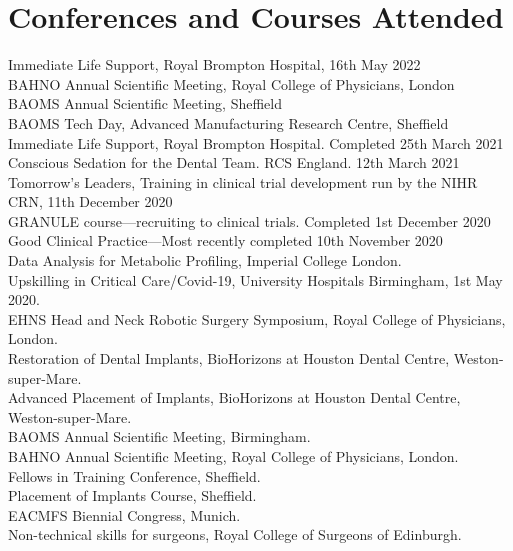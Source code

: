 \section*{Conferences and Courses Attended}

 Immediate Life Support, Royal Brompton Hospital, 16th May 2022 \\
 BAHNO Annual Scientific Meeting, Royal College of Physicians, London \\
 BAOMS Annual Scientific Meeting, Sheffield \\
 BAOMS Tech Day, Advanced Manufacturing Research Centre, Sheffield \\
 Immediate Life Support, Royal Brompton Hospital. Completed 25th March 2021 \\
 Conscious Sedation for the Dental Team. RCS England. 12th March 2021 \\
 Tomorrow's Leaders, Training in clinical trial development run by the NIHR CRN, 11th December 2020 \\ 
 GRANULE course---recruiting to clinical trials. Completed 1st December 2020 \\
 Good Clinical Practice---Most recently completed 10th November 2020 \\
 Data Analysis for Metabolic Profiling, Imperial College London. \\
 Upskilling in Critical Care/Covid-19, University Hospitals Birmingham, 1st May 2020. \\
 EHNS Head and Neck Robotic Surgery Symposium, Royal College of Physicians, London. \\
 Restoration of Dental Implants, BioHorizons at Houston Dental Centre,  Weston-super-Mare. \\
 Advanced Placement of Implants, BioHorizons at Houston Dental Centre,  Weston-super-Mare. \\
 BAOMS Annual Scientific Meeting, Birmingham. \\
 BAHNO Annual Scientific Meeting, Royal College of Physicians, London. \\
 Fellows in Training Conference,  Sheffield. \\
 Placement of Implants Course, Sheffield. \\
 EACMFS Biennial Congress, Munich. \\
 Non-technical skills for surgeons, Royal College of Surgeons of Edinburgh. \\
